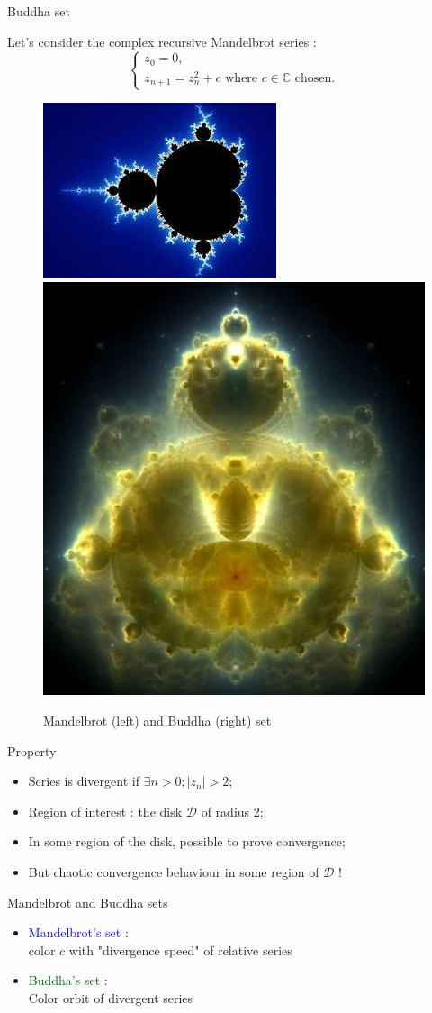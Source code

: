 \documentclass[compress,10pt,aspectratio=169]{beamer}
\begin{document}
\begin{frame}[fragile]{Buddha set}
  \scriptsize
  \begin{multicols}{2}
  Let's consider the complex recursive Mandelbrot series :
  \[
  \left\{
  \begin{array}{l}
  z_{0}=0,\\
  z_{n+1} = z_{n}^{2} +c \mbox{ where } c\in\mathbb{C} \mbox{ chosen.}
  \end{array}\right.
  \]

  \begin{figure}[h]
    \includegraphics[width=0.3\linewidth]{../Images/mandelbrot.jpeg}
    \includegraphics[width=0.2\linewidth]{../Images/bhudda.jpg}
    \caption{\small Mandelbrot (left) and Buddha (right) set}
  \end{figure}
  \end{multicols}

  \begin{multicols}{2}
  \begin{block}{\small Property}
  \begin{itemize}
  \item Series is divergent if $\exists n>0; |z_{n}|>2$;
  \item Region of interest : the disk $\mathcal{D}$ of radius 2;
  \item In some region of the disk, possible to prove convergence;
  \item But chaotic convergence behaviour in some region of $\mathcal{D}$ !
  \end{itemize}
  \end{block}

  \begin{exampleblock}{\small Mandelbrot and Buddha sets}
    \begin{itemize}
    \item \textcolor{blue}{Mandelbrot's set} : \\ color $c$ with  "divergence speed" of relative series
    \item \textcolor{DarkGreen}{Buddha's set} : \\ Color  orbit of divergent series
    \end{itemize}
  \end{exampleblock}
  \end{multicols}
\end{frame}
\end{document}
